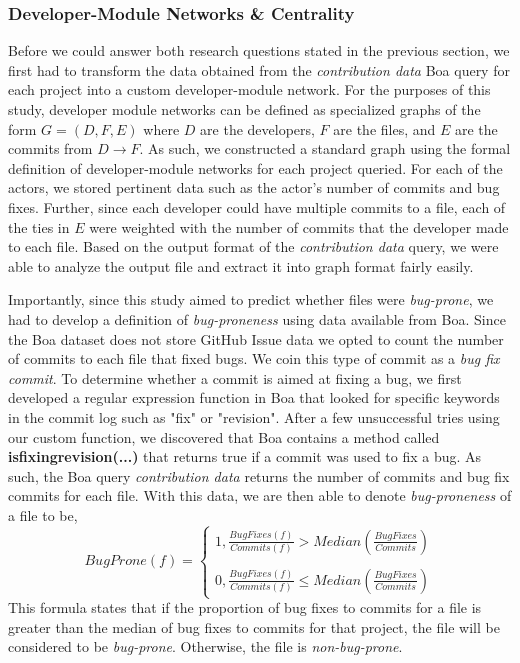 \documentclass{sig-alternate-05-2015}
\begin{document}
\subsubsection{Developer-Module Networks \& Centrality}
\label{developer_networks}
Before we could answer both research questions stated in the previous section, we first had to transform the data obtained from the \textit{contribution data} Boa query for each project into a custom developer-module network. For the purposes of this study, developer module networks can be defined as specialized graphs of the form \(G = (D, F, E)\) where \(D\) are the developers, \(F\) are the files, and \(E\) are the commits from \(D \to F\). As such, we constructed a standard graph using the formal definition of developer-module networks for each project queried. For each of the actors, we stored pertinent data such as the actor's number of commits and bug fixes. Further, since each developer could have multiple commits to a file, each of the ties in \(E\) were weighted with the number of commits that the developer made to each file. Based on the output format of the \textit{contribution data} query, we were able to analyze the output file and extract it into graph format fairly easily.

Importantly, since this study aimed to predict whether files were \textit{bug-prone}, we had to develop a definition of \textit{bug-proneness} using data available from Boa. Since the Boa dataset does not store GitHub Issue data we opted to count the number of commits to each file that fixed bugs. We coin this type of commit as a \textit{bug fix commit}. To determine whether a commit is aimed at fixing a bug, we first developed a regular expression function in Boa that looked for specific keywords in the commit log such as "fix" or "revision". After a few unsuccessful tries using our custom function, we discovered that Boa contains a method called \textbf{isfixingrevision(...)} that returns true if a commit was used to fix a bug. As such, the Boa query \textit{contribution data} returns the number of commits and bug fix commits for each file. With this data, we are then able to denote \textit{bug-proneness} of a file to be,
\[BugProne(f) = \begin{cases} 1, \frac{BugFixes(f)}{Commits(f)} > Median(\frac{BugFixes}{Commits}) 
\\\\0, \frac{BugFixes(f)}{Commits(f)} \leq Median(\frac{BugFixes}{Commits})
\end{cases}\]
This formula states that if the proportion of bug fixes to commits for a file is greater than the median of bug fixes to commits for that project, the file will be considered to be \textit{bug-prone}. Otherwise, the file is \textit{non-bug-prone}. 
\end{document}
